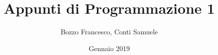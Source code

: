 \documentclass[a4paper,12pt]{book}
\begin{document}
\author{Bozzo Francesco, Conti Samuele}
\title{Appunti di Programmazione 1}
\date{Gennaio 2019}

\frontmatter
\maketitle
\tableofcontents

\mainmatter










\backmatter
\end{document}
